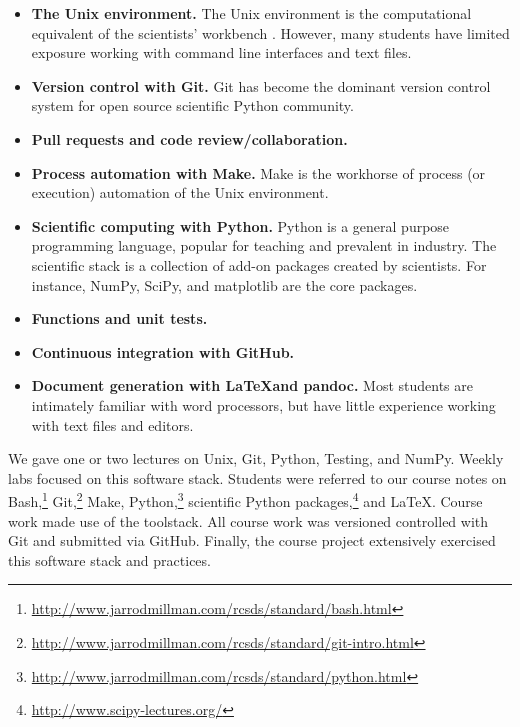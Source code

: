 \begin{itemize}
\item \textbf{The Unix environment.}
The Unix environment is the computational equivalent of the scientists'
workbench \citep{preeyanon2014reproducible}.
However, many students have limited exposure working with
command line interfaces and text files.

\item \textbf{Version control with Git.}
Git has become the dominant version control system for open source scientific
Python community.

\item \textbf{Pull requests and code review/collaboration.}

\item \textbf{Process automation with Make.}
Make is the workhorse of process (or execution) automation of the Unix environment.

\item \textbf{Scientific computing with Python.}
Python is a general purpose programming language,
popular for teaching and prevalent in industry.
The scientific stack is a collection of add-on packages created by scientists.
For instance, NumPy, SciPy, and matplotlib are the core packages.

\item \textbf{Functions and unit tests.}

\item  \textbf{Continuous integration with GitHub.}

\item \textbf{Document generation with \LaTeX and pandoc.}
Most students are intimately familiar with word processors, but have little experience
working with text files and editors.

\end{itemize}

We gave one or two lectures on Unix, Git, Python, Testing, and NumPy.
Weekly labs focused on this software stack.
Students were referred to our course notes on
Bash,\footnote{\url{http://www.jarrodmillman.com/rcsds/standard/bash.html}}
Git,\footnote{\url{http://www.jarrodmillman.com/rcsds/standard/git-intro.html}}
Make,
Python,\footnote{\url{http://www.jarrodmillman.com/rcsds/standard/python.html}}
scientific Python packages,\footnote{\url{http://www.scipy-lectures.org/}}
and \LaTeX.
Course work made use of the toolstack.
All course work was versioned controlled with Git
and submitted via GitHub.
Finally, the course project extensively exercised this software stack
and practices.

